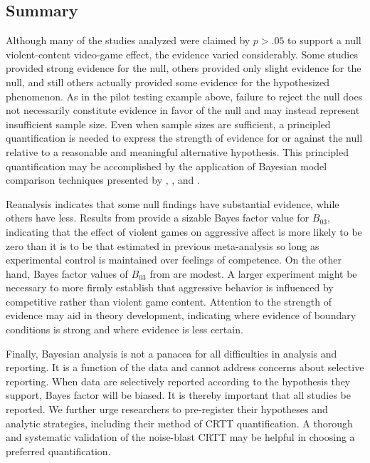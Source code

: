 \documentclass[man]{apa6}
\begin{document}
\subsection{Summary}
Although many of the studies analyzed were claimed by $p>.05$ to support a null violent-content video-game effect, the evidence varied considerably.  Some studies provided strong evidence for the null, others provided only slight evidence for the null, and still others actually provided some evidence for the hypothesized phenomenon. As in the pilot testing example above, failure to reject the null does not necessarily constitute evidence in favor of the null and may instead represent insufficient sample size. Even when sample sizes are sufficient, a principled quantification is needed to express the strength of evidence for or against the null relative to a reasonable and meaningful alternative hypothesis. This principled quantification may be accomplished by the application of Bayesian model comparison techniques presented by \citet{Rouder:Morey:2012}, \citet{Rouder:etal:2012}, and \citet{Dienes:2011, Dienes:2014}. 

Reanalysis indicates that some null findings have substantial evidence, while others have less. Results from \citet{Przybylski:etal:2014} provide a sizable Bayes factor value for $B_{03}$, indicating that the effect of violent games on aggressive affect is more likely to be zero than it is to be that estimated in previous meta-analysis so long as experimental control is maintained over feelings of competence. On the other hand, Bayes factor values of $B_{03}$ from \citet{Adachi:Willoughby:2011} are modest.  A larger experiment might be necessary to more firmly establish that aggressive behavior is influenced by competitive rather than violent game content. Attention to the strength of evidence may aid in theory development, indicating where evidence of boundary conditions is strong and where evidence is less certain.

Finally, Bayesian analysis is not a panacea for all difficulties in analysis and reporting.  It is a function of the data and cannot address concerns about selective reporting.  When data are selectively reported according to the hypothesis they support, Bayes factor will be biased. It is thereby important that all studies be reported. 
% 
We further urge researchers to pre-register their hypotheses and analytic strategies, including their method of CRTT quantification. A thorough and systematic validation of the noise-blast CRTT may be helpful in choosing a preferred quantification. 
\end{document}

